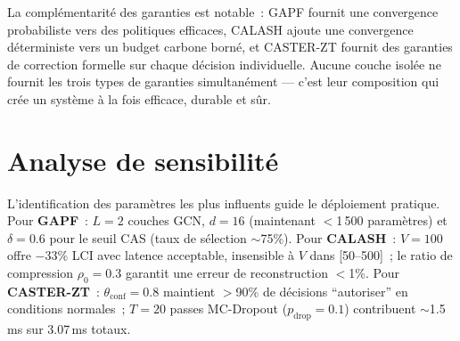 \begin{table}[htbp]
\centering
\caption{Synthèse des propriétés de convergence et garanties théoriques de la pile protocolaire.}
\label{tab:convergence-summary}
\end{table}

La complémentarité des garanties est notable~: GAPF fournit une convergence probabiliste vers des politiques efficaces, CALASH ajoute une convergence déterministe vers un budget carbone borné, et CASTER-ZT fournit des garanties de correction formelle sur chaque décision individuelle. Aucune couche isolée ne fournit les trois types de garanties simultanément --- c'est leur composition qui crée un système à la fois efficace, durable et sûr.


\section{Analyse de sensibilité}\label{sec:disc-sensibilite}

L'identification des paramètres les plus influents guide le déploiement pratique. Pour \textbf{GAPF}~: $L=2$ couches GCN, $d=16$ (maintenant $<$1\,500 paramètres) et $\delta=0.6$ pour le seuil CAS (taux de sélection $\sim$75\%). Pour \textbf{CALASH}~: $V=100$ offre $-33\%$ LCI avec latence acceptable, insensible à $V$ dans [50--500]~; le ratio de compression $\rho_0=0.3$ garantit une erreur de reconstruction $<$1\%. Pour \textbf{CASTER-ZT}~: $\theta_\mathrm{conf}=0.8$ maintient $>$90\% de décisions ``autoriser'' en conditions normales~; $T=20$ passes MC-Dropout ($p_\mathrm{drop}=0.1$) contribuent $\sim$1.5\,ms sur 3.07\,ms totaux.

